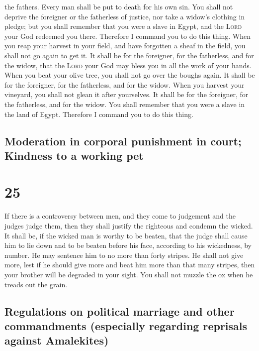 the fathers. Every man shall be put to death for his own sin.
 You shall not deprive the foreigner or the fatherless of
justice, nor take a widow's clothing in pledge;  but you
shall remember that you were a slave in Egypt, and the \textsc{Lord}
your God redeemed you there. Therefore I command you to do this thing.
 When you reap your harvest in your field, and have
forgotten a sheaf in the field, you shall not go again to get it. It
shall be for the foreigner, for the fatherless, and for the widow, that
the \textsc{Lord} your God may bless you in all the work of your hands.
 When you beat your olive tree, you shall not go over the
boughs again. It shall be for the foreigner, for the fatherless, and for
the widow.  When you harvest your vineyard, you shall not
glean it after yourselves. It shall be for the foreigner, for the
fatherless, and for the widow.  You shall remember that
you were a slave in the land of Egypt. Therefore I command you to do
this thing.

\hypertarget{moderation-in-corporal-punishment-in-court-kindness-to-a-working-pet}{%
\subsection{Moderation in corporal punishment in court; Kindness to a
working
pet}\label{moderation-in-corporal-punishment-in-court-kindness-to-a-working-pet}}

\hypertarget{section-24}{%
\section{25}\label{section-24}}

 If there is a controversy between men, and they come to
judgement and the judges judge them, then they shall justify the
righteous and condemn the wicked.  It shall be, if the
wicked man is worthy to be beaten, that the judge shall cause him to lie
down and to be beaten before his face, according to his wickedness, by
number.  He may sentence him to no more than forty
stripes. He shall not give more, lest if he should give more and beat
him more than that many stripes, then your brother will be degraded in
your sight.  You shall not muzzle the ox when he treads
out the grain.

\hypertarget{regulations-on-political-marriage-and-other-commandments-especially-regarding-reprisals-against-amalekites}{%
\subsection{Regulations on political marriage and other commandments
(especially regarding reprisals against
Amalekites)}\label{regulations-on-political-marriage-and-other-commandments-especially-regarding-reprisals-against-amalekites}}

